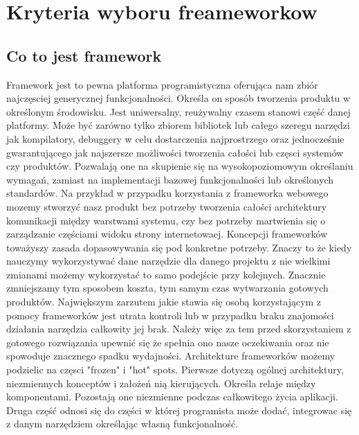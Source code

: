 \documentclass[12pt]{report}
\begin{document}
\chapter{Kryteria wyboru freameworkow}
  \section{Co to jest framework}
    Framework jest to pewna platforma programistyczna oferująca nam zbiór najczęsciej generycznej funkcjonalności.
    Określa on sposób tworzenia produktu w określonym środowisku.
    Jest uniwersalny, reużywalny czasem stanowi część danej platformy.
    Może być zarówno tylko zbiorem bibliotek lub całego szeregu narzędzi jak kompilatory, debuggery w celu dostarczenia najprostrzego oraz jednocześnie gwarantującego jak najszersze możliwości tworzenia całości lub częsci systemów czy produktów.
    Pozwalają one na skupienie się na wysokopoziomowym określaniu wymagań, zamiast na implementacji bazowej funkcjonalności lub określonych standardów. 
    Na przykład w przypadku korzystania z frameworka webowego mozemy stworzyć nasz produkt bez potrzeby tworzenia całości architektury komunikacji między warstwami systemu, czy bez potrzeby martwienia się o zarządzanie częściami widoku strony internetowaej.
    Koncepcji frameworków toważyszy zasada dopasowywania się pod konkretne potrzeby.
    Znaczy to że kiedy nauczymy wykorzystywać dane narzędzie dla danego projektu z nie wielkimi zmianami możemy wykorzystać to samo podejście przy kolejnych.
    Znacznie zmniejszamy tym sposobem koszta, tym samym czas wytwarzania gotowych produktów.
    Największym zarzutem jakie stawia się osobą korzystającym z pomocy frameworków jest utrata kontroli lub w przypadku braku znajomości działania narzędzia całkowity jej brak.
    Należy więc za tem przed skorzystaniem z gotowego rozwiązania upewnić się że spełnia ono nasze oczekiwania oraz nie spowoduje znacznego spadku wydajności.
    Architekture frameworków możemy podzielic na częsci "frozen" i "hot" spots.
    Pierwsze dotyczą ogólnej architektury, niezmiennych konceptów i założeń nią kierujących.
    Określa relaje między komponentami.
    Pozostają one niezmienne podczas całkowitego życia aplikacji.
    Druga część odnosi się do części w której programista może dodać, integrowac się z danym narzędziem określając własną funkcjonalność.
\end{document}
